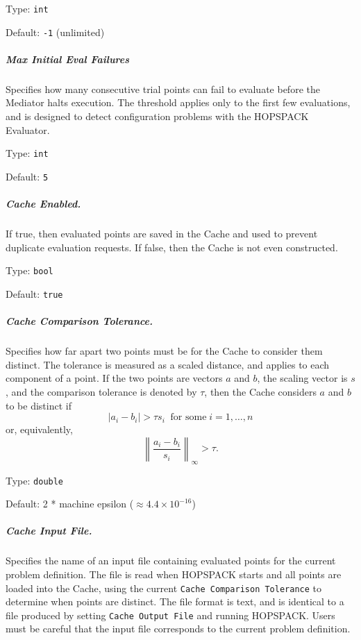 \hspace{0.2in}
Type: {\tt int}

\hspace{0.2in}
Default: {\tt -1} (unlimited)

\subparagraph{Max Initial Eval Failures}  \label{param:MD-maxinitfails}
Specifies how many consecutive trial points can fail to evaluate before
the Mediator halts execution.  The threshold applies only to the first few
evaluations, and is designed to detect configuration problems with the
HOPSPACK Evaluator.

\hspace{0.2in}
Type: {\tt int}

\hspace{0.2in}
Default: {\tt 5}

\subparagraph{Cache Enabled.}  \label{param:MD-cacheenabled}
If true, then evaluated points are saved in the Cache and used to prevent
duplicate evaluation requests.  If false, then the Cache is not even constructed.

\hspace{0.2in}
Type: {\tt bool}

\hspace{0.2in}
Default: {\tt true}

\subparagraph{Cache Comparison Tolerance.}  \label{param:MD-cachetol}
Specifies how far apart two points must be for the Cache to
consider them distinct.  The tolerance is measured as a scaled distance, and
applies to each component of a point.  If the two points are vectors $a$
and $b$, the scaling vector is $s$, and the comparison tolerance is
denoted by $\tau$, then the Cache considers $a$ and $b$ to be distinct if
\[
     |a_i - b_i| > \tau s_i \;\; \mbox{for some} \; i = 1, \dots, n
\]
or, equivalently,
\[
     \left\| \frac{a_i - b_i}{s_i} \right\|_{\infty} > \tau .
\]

\hspace{0.2in}
Type: {\tt double}

\hspace{0.2in}
Default: 2 * machine epsilon ($\approx 4.4 \times 10^{-16}$)

\subparagraph{Cache Input File.}  \label{param:MD-cacheinfile}
Specifies the name of an input file containing evaluated points
for the current problem definition.
The file is read when HOPSPACK starts and all points are loaded into the Cache,
using the current {\tt Cache Comparison Tolerance} to determine when points are
distinct.  The file format is text, and is identical to a file produced by
setting {\tt Cache Output File} and running HOPSPACK.  Users must be careful
that the input file corresponds to the current problem definition.

